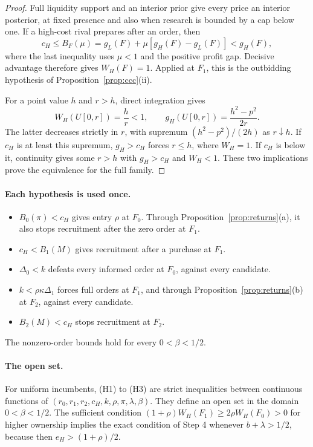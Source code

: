 \begin{proof}
Full liquidity support and an interior prior give every price an interior posterior, at fixed presence and
also when research is bounded by a cap below one. If a high-cost rival prepares after an order, then
\[
c_H\le B_F(\mu)=g_L(F)+\mu[g_H(F)-g_L(F)]<g_H(F),
\]
where the last inequality uses \(\mu<1\) and the positive profit gap. Decisive advantage therefore gives
\(W_H(F)=1\). Applied at \(F_1\), this is the outbidding hypothesis of Proposition~\ref{prop:ccc}(ii).

For a point value \(h\) and \(r>h\), direct integration gives
\[
W_H(U[0,r])=\frac hr<1,\qquad g_H(U[0,r])=\frac{h^2-p^2}{2r}.
\]
The latter decreases strictly in \(r\), with supremum \((h^2-p^2)/(2h)\) as \(r\downarrow h\).
If \(c_H\) is at least this supremum, \(g_H>c_H\) forces \(r\le h\), where \(W_H=1\).
If \(c_H\) is below it, continuity gives some \(r>h\) with \(g_H>c_H\) and \(W_H<1\).
These two implications prove the equivalence for the full family.
\end{proof}


\paragraph{Each hypothesis is used once.}
\begin{itemize}[leftmargin=2em]
\item \(B_0(\pi)<c_H\) gives entry \(\rho\) at \(F_0\). Through Proposition~\ref{prop:returns}(a), it also stops
recruitment after the zero order at \(F_1\).
\item \(c_H<B_1(M)\) gives recruitment after a purchase at \(F_1\).
\item \(\Delta_0<k\) defeats every informed order at \(F_0\), against every candidate.
\item \(k<\rho\kappa\Delta_1\) forces full orders at \(F_1\), and through Proposition~\ref{prop:returns}(b) at \(F_2\),
against every candidate.
\item \(B_2(M)<c_H\) stops recruitment at \(F_2\).
\end{itemize}
The nonzero-order bounds hold for every \(0<\beta<1/2\).

\paragraph{The open set.}
For uniform incumbents, (H1) to (H3) are strict inequalities between continuous functions of
\((r_0,r_1,r_2,c_H,k,\rho,\pi,\lambda,\beta)\). They define an open set in the domain \(0<\beta<1/2\).
The sufficient condition
\((1+\rho)W_H(F_1)\ge2\rho W_H(F_0)>0\) for higher ownership implies the exact condition of Step 4 whenever
\(b+\lambda>1/2\), because then \(e_H>(1+\rho)/2\).

